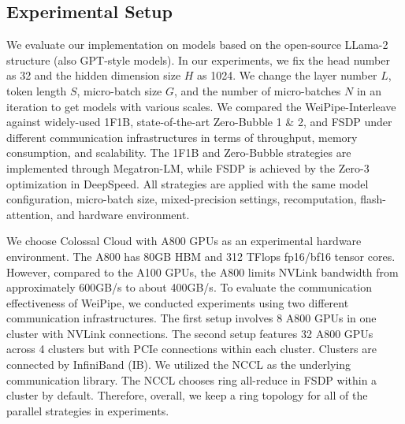 \documentclass[sigplan,review,anonymous]{acmart}
\begin{document}
\subsection{Experimental Setup}

We evaluate our implementation on models based on the open-source LLama-2 structure\cite{touvron2023llama2openfoundation} (also GPT-style models). In our experiments, we fix the head number as 32 and the hidden dimension size $H$ as 1024. We change the layer number $L$, token length $S$, micro-batch size $G$, and the number of micro-batches $N$ in an iteration to get models with various scales. We compared the WeiPipe-Interleave against widely-used 1F1B, state-of-the-art Zero-Bubble 1 \& 2, and FSDP under different communication infrastructures in terms of throughput, memory consumption, and scalability. The 1F1B and Zero-Bubble strategies are implemented through Megatron-LM, while FSDP is achieved by the Zero-3 optimization in DeepSpeed. All strategies are applied with the same model configuration, micro-batch size, mixed-precision settings, recomputation, flash-attention, and hardware environment. 


We choose Colossal Cloud with A800 GPUs as an experimental hardware environment. The A800 has 80GB HBM and 312 TFlops fp16/bf16 tensor cores. However, compared to the A100 GPUs, the A800 limits NVLink bandwidth from approximately 600GB/s to about 400GB/s. To evaluate the communication effectiveness of WeiPipe, we conducted experiments using two different communication infrastructures. The first setup involves 8 A800 GPUs in one cluster with NVLink\cite{nvlink} connections. The second setup features 32 A800 GPUs across 4 clusters but with PCIe connections within each cluster. Clusters are connected by InfiniBand (IB). We utilized the NCCL as the underlying communication library. The NCCL chooses ring all-reduce in FSDP within a cluster by default. Therefore, overall, we keep a ring topology for all of the parallel strategies in experiments.
\end{document}
